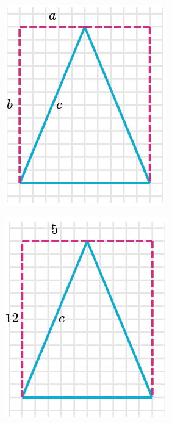 \begin{solutionbox}{14cm}
\begin{minipage}{0.4\textwidth}
\begin{multicols}{2}
\begin{figure}[H]
                \includegraphics[width=0.9\linewidth]{../images/peri_isos_01b.png}
                \caption{}
                \label{fig:peri_isos_01b}
            \end{figure}
        \end{multicols}
        \begin{multicols}{2}
            \begin{figure}[H]
                \centering
                \includegraphics[width=0.9\linewidth]{../images/peri_isos_01c.png}

\end{figure}
\end{multicols}
\end{minipage}
\end{solutionbox}
